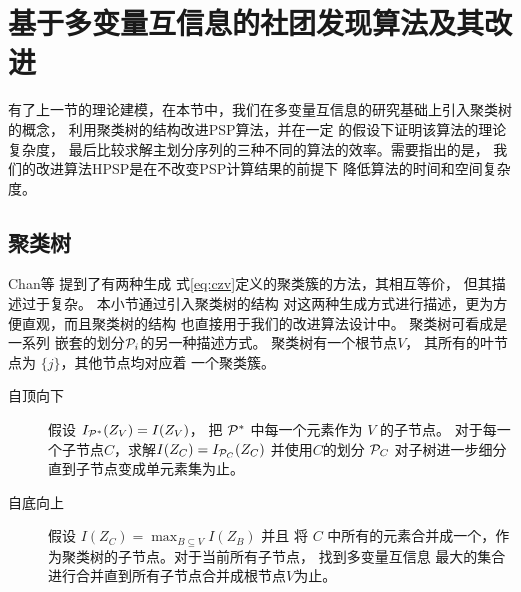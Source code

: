 \section{基于多变量互信息的社团发现算法及其改进}\label{sec:mmi_community_detection}
有了上一节的理论建模，在本节中，我们在多变量互信息的研究基础上引入聚类树的概念，
利用聚类树的结构改进PSP算法，并在一定
的假设下证明该算法的理论复杂度，
最后比较求解主划分序列的三种不同的算法的效率。需要指出的是，
我们的改进算法HPSP是在不改变PSP计算结果的前提下
降低算法的时间和空间复杂度。
\subsection{聚类树}

Chan等\cite{chan2020agglomerative} 提到了有两种生成
式\eqref{eq:czv}定义的聚类簇的方法，其相互等价，
但其描述过于复杂。
本小节通过引入聚类树的结构
对这两种生成方式进行描述，更为方便直观，而且聚类树的结构
也直接用于我们的改进算法设计中。
聚类树可看成是一系列
嵌套的划分$\P_i$的另一种描述方式。
聚类树有一个根节点$V$，
其所有的叶节点为 $\{j\}$，其他节点均对应着
一个聚类簇。

\begin{description}
  \item[自顶向下] 假设 $I_{\P^*}(Z_V)=I(Z_V)$，
  把 $\P^*$ 中每一个元素作为 $V$ 的子节点。
  对于每一个子节点$C$，求解$I(Z_C)=I_{\P_C}(Z_C)$
  并使用$C$的划分 $\P_C$ 对子树进一步细分直到子节点变成单元素集为止。
  \item[自底向上] 假设 $I(Z_C) = \max_{B\subseteq V} I(Z_B)$ 并且 
  将 $C$ 中所有的元素合并成一个，作为聚类树的子节点。对于当前所有子节点，
  找到多变量互信息
  最大的集合进行合并直到所有子节点合并成根节点$V$为止。
  \end{description}

